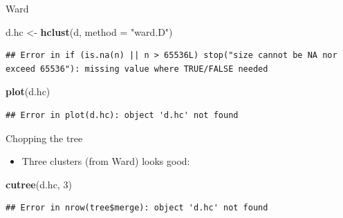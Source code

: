 \documentclass[ignorenonframetext,]{beamer}
\newenvironment{Shaded}{\begin{snugshade}}{\end{snugshade}}
\newcommand{\DataTypeTok}[1]{\textcolor[rgb]{0.13,0.29,0.53}{#1}}
\newcommand{\DecValTok}[1]{\textcolor[rgb]{0.00,0.00,0.81}{#1}}
\newcommand{\KeywordTok}[1]{\textcolor[rgb]{0.13,0.29,0.53}{\textbf{#1}}}
\newcommand{\NormalTok}[1]{#1}
\newcommand{\StringTok}[1]{\textcolor[rgb]{0.31,0.60,0.02}{#1}}
\providecommand{\tightlist}{%
  \setlength{\itemsep}{0pt}\setlength{\parskip}{0pt}}
\begin{document}
\begin{frame}[fragile]{Ward}
\protect\hypertarget{ward}{}

\begin{Shaded}
\begin{Highlighting}[]
\NormalTok{d.hc <-}\StringTok{ }\KeywordTok{hclust}\NormalTok{(d, }\DataTypeTok{method =} \StringTok{"ward.D"}\NormalTok{)}
\end{Highlighting}
\end{Shaded}

\begin{verbatim}
## Error in if (is.na(n) || n > 65536L) stop("size cannot be NA nor exceed 65536"): missing value where TRUE/FALSE needed
\end{verbatim}

\begin{Shaded}
\begin{Highlighting}[]
\KeywordTok{plot}\NormalTok{(d.hc)}
\end{Highlighting}
\end{Shaded}

\begin{verbatim}
## Error in plot(d.hc): object 'd.hc' not found
\end{verbatim}

\end{frame}

\begin{frame}[fragile]{Chopping the tree}
\protect\hypertarget{chopping-the-tree}{}

\begin{itemize}
\tightlist
\item
  Three clusters (from Ward) looks good:
\end{itemize}

\begin{Shaded}
\begin{Highlighting}[]
\KeywordTok{cutree}\NormalTok{(d.hc, }\DecValTok{3}\NormalTok{)}
\end{Highlighting}
\end{Shaded}

\begin{verbatim}
## Error in nrow(tree$merge): object 'd.hc' not found
\end{verbatim}

\end{frame}
\end{document}

